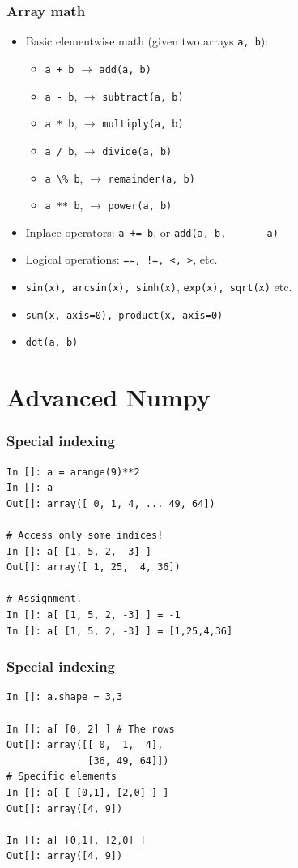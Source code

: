 \documentclass[14pt,compress]{beamer}
\newcounter{time}
\newcommand{\inctime}[1]{\addtocounter{time}{#1}{\tiny \thetime\ m}}
\newcommand{\typ}[1]{\lstinline{#1}}
\begin{document}
\begin{frame}[fragile]
  \frametitle{Array math}
  \begin{itemize}
  \item Basic \alert{elementwise} math (given two arrays \typ{a, b}):
    \begin{itemize}
        \item \typ{a + b} $\rightarrow$ \typ{add(a, b)} 
        \item \typ{a - b}, $\rightarrow$ \typ{subtract(a, b)} 
        \item \typ{a * b}, $\rightarrow$ \typ{multiply(a, b)} 
        \item \typ{a / b}, $\rightarrow$ \typ{divide(a, b)} 
        \item \typ{a \% b}, $\rightarrow$ \typ{remainder(a, b)} 
        \item \typ{a ** b}, $\rightarrow$ \typ{power(a, b)}
    \end{itemize}
  \item Inplace operators: \typ{a += b}, or \typ{add(a, b,
      a)}
  \item Logical operations: \typ{==, !=, <, >}, etc.
  \item \typ{sin(x), arcsin(x), sinh(x)},
      \typ{exp(x), sqrt(x)} etc.
  \item \typ{sum(x, axis=0), product(x, axis=0)}
  \item \typ{dot(a, b)}
  \end{itemize}
  \inctime{10}
\end{frame}

\section{Advanced Numpy}

\begin{frame}[fragile]
  \frametitle{Special indexing}
  \begin{lstlisting}
In []: a = arange(9)**2
In []: a
Out[]: array([ 0, 1, 4, ... 49, 64])

# Access only some indices!
In []: a[ [1, 5, 2, -3] ]
Out[]: array([ 1, 25,  4, 36])

# Assignment.
In []: a[ [1, 5, 2, -3] ] = -1
In []: a[ [1, 5, 2, -3] ] = [1,25,4,36]
  \end{lstlisting}
\end{frame}

\begin{frame}[fragile]
  \frametitle{Special indexing}
  \begin{lstlisting}
In []: a.shape = 3,3

In []: a[ [0, 2] ] # The rows
Out[]: array([[ 0,  1,  4],
              [36, 49, 64]])
# Specific elements
In []: a[ [ [0,1], [2,0] ] ]
Out[]: array([4, 9])

In []: a[ [0,1], [2,0] ] 
Out[]: array([4, 9])

  \end{lstlisting}
\end{frame}
\end{document}
